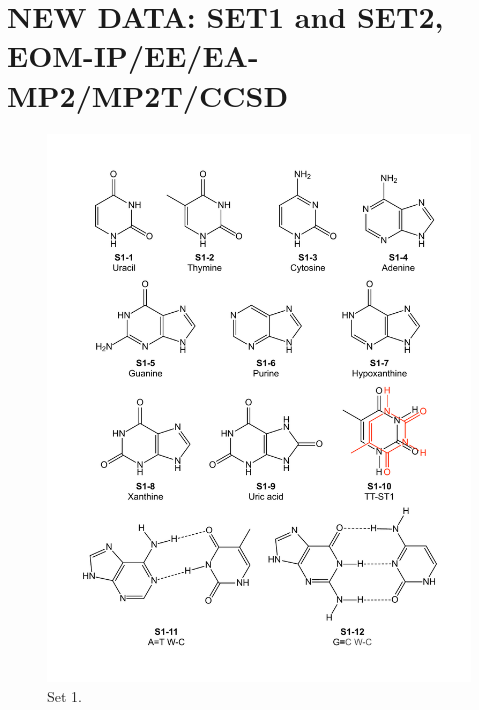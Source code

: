 \documentclass[12pt,nofootinbib]{revtex4}
\begin{document}
\section{NEW DATA: SET1 and SET2, EOM-IP/EE/EA-MP2/MP2T/CCSD}
\begin{figure}[!tbh]
	\includegraphics[width=15cm]{./figures/set1.pdf}
	\caption{Set 1.
		\protect\label{fig:set1}}
\end{figure}
\end{document}
